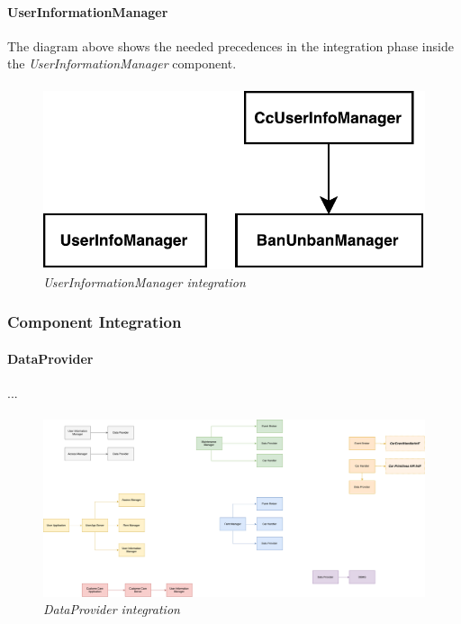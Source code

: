 \paragraph{UserInformationManager} 
The diagram above shows the needed precedences in the integration phase inside the \emph{UserInformationManager} component.
\paragraph{}

		\begin{figure}[h]
			\centering
			\includegraphics[width=0.6\linewidth]{img/userIntegration}
			\caption{
				\label{fig:userIntegration} 
				\emph{UserInformationManager integration}
			}
		\end{figure}

\clearpage

\subsubsection{Component Integration}

\paragraph{DataProvider} 
...
\paragraph{}

		\begin{figure}[h]
			\centering
			\includegraphics[width=0.6\linewidth]{img/Integration1}
			\caption{
				\label{fig:dataProvider} 
				\emph{DataProvider integration}
			}
		\end{figure}

